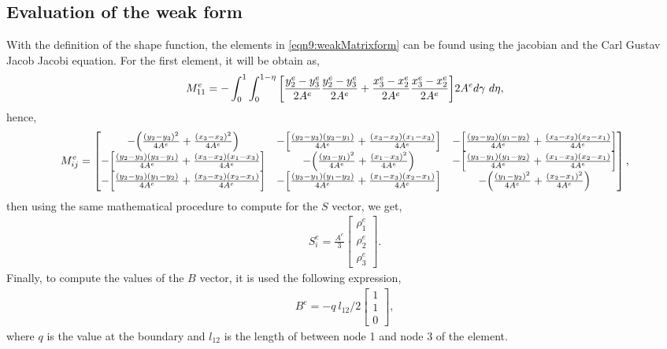 \documentclass[main.tex]{subfiles}
\begin{document}
\subsection{Evaluation of the weak form}
With the definition of the shape function, the elements in \cref{eqn9:weakMatrixform} can be found using the jacobian and the Carl Gustav Jacob Jacobi equation.
For the first element, it will be obtain as,
\begin{gather*}
    M_{11}^e = -\int_0^1\int_0^{1-\eta}\qty[\frac{y_2^e-y_3^e}{2A^e}\frac{y_2^e-y_3^e}{2A^e}+\frac{x_3^e-x_2^e}{2A^e}\frac{x_3^e-x_2^e}{2A^e}]2A^e d\gamma~d\eta,
\end{gather*}
hence,
\begin{gather*}
    M_{ij}^e
    =
    \begin{bmatrix}
        -\qty(\frac{\qty(y_2-y_3)^2}{4A^e}+\frac{\qty(x_3-x_2)^2}{4A^e}) & -\qty[\frac{\qty(y_2-y_3)\qty(y_3-y_1)}{4A^e}+\frac{\qty(x_3-x_2)\qty(x_1-x_3)}{4A^e}] & -\qty[\frac{\qty(y_2-y_3)\qty(y_1-y_2)}{4A^e}+\frac{\qty(x_3-x_2)\qty(x_2-x_1)}{4A^e}] \\
        -\qty[\frac{\qty(y_2-y_3)\qty(y_3-y_1)}{4A^e}+\frac{\qty(x_3-x_2)\qty(x_1-x_3)}{4A^e}] & -\qty(\frac{\qty(y_3-y_1)^2}{4A^e}+\frac{\qty(x_1-x_3)^2}{4A^e}) & -\qty[\frac{\qty(y_3-y_1)\qty(y_1-y_2)}{4A^e}+\frac{\qty(x_1-x_3)\qty(x_2-x_1)}{4A^e}] \\
        -\qty[\frac{\qty(y_2-y_3)\qty(y_1-y_2)}{4A^e}+\frac{\qty(x_3-x_2)\qty(x_2-x_1)}{4A^e}] & -\qty[\frac{\qty(y_3-y_1)\qty(y_1-y_2)}{4A^e}+\frac{\qty(x_1-x_3)\qty(x_2-x_1)}{4A^e}] & -\qty(\frac{\qty(y_1-y_2)^2}{4A^e}+\frac{\qty(x_2-x_1)^2}{4A^e}) 
    \end{bmatrix},
\end{gather*}
then using the same mathematical procedure to compute for the $S$ vector, we get,
\begin{gather*}
    S_i^e =
    \frac{A^e}{3}
    \begin{bmatrix}
        \rho_{1}^e \\
        \rho_{2}^e \\
        \rho_{3}^e
    \end{bmatrix}.
\end{gather*}
Finally, to compute the values of the $B$ vector, it is used the following expression,
\begin{gather*}
    B^e = 
    -q~l_{12}/2
    \begin{bmatrix}
         1 \\ 1 \\ 0
    \end{bmatrix},
\end{gather*}
where $q$ is the value at the boundary and $l_{12}$ is the length of between node 1 and node 3 of the element.
\end{document}
